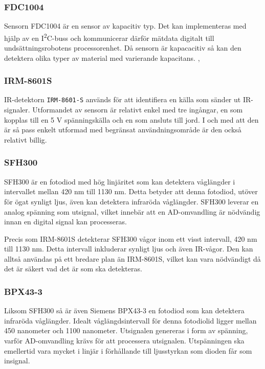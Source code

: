 \documentclass[11pt]{article}
\begin{document}
\begin{flushleft}
\subsubsection{FDC1004} %
Sensorn FDC1004 är en sensor av kapacitiv typ. Det kan implementeras med hjälp av en I\textsuperscript{2}C-buss och kommunicerar därför mätdata digitalt till undsättningsrobotens processorenhet. Då sensorn är kapacacitiv så kan den detektera olika typer av material med varierande kapacitans. \cite{Texas}, \cite{Texas2}

\subsubsection{IRM-8601S} %
IR-detektorn \verb+IRM-8601-S+ används för att identifiera en källa som sänder ut IR-signaler. Utformandet av sensorn är relativt enkel med tre ingångar, en som kopplas till en 5 V spänningskälla och en som ansluts till jord. I och med att den är så pass enkelt utformad med begränsat användningsområde är den också relativt billig. \cite{IRM}

\subsubsection{SFH300} %
SFH300 är en fotodiod med hög linjäritet som kan detektera våglängder i intervallet mellan 420 nm till 1130 nm. Detta betyder att denna fotodiod, utöver för ögat synligt ljus, även kan detektera infraröda våglängder. SFH300 leverar en analog spänning som utsignal, vilket innebär att en AD-omvandling är nödvändig innan en digital signal kan processeras. \cite{Osram}

Precis som IRM-8601S detekterar SFH300 vågor inom ett visst intervall, 420 nm till 1130 nm. Detta intervall inkluderar synligt ljus och även IR-vågor. Den kan alltså användas på ett bredare plan än IRM-8601S, vilket kan vara nödvändigt då det är säkert vad det är som ska detekteras. \cite{Osram}

\subsubsection{BPX43-3}
Liksom SFH300 så är även Siemens BPX43-3 en fotodiod som kan detektera infraröda våglängder. Idealt våglängdsintervall för denna fotodiolid ligger mellan 450 nanometer och 1100 nanometer. Utsignalen genereras i form av spänning, varför AD-omvandling krävs för att processera utsignalen. Utspänningen ska emellertid vara mycket i linjär i förhållande till ljusstyrkan som dioden får som insignal. \cite{siemens}


\end{flushleft}
\end{document}
